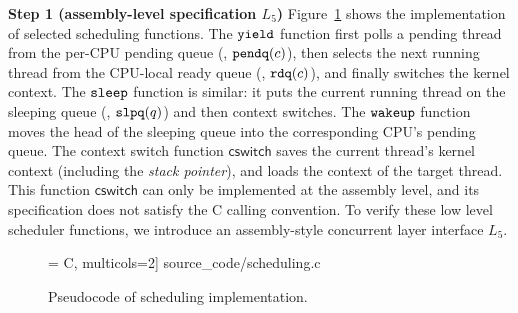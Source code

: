 {\noindent\textbf{Step 1 (assembly-level specification $L_5$)} 
Figure~\ref{fig:exp:sched} shows the implementation
of selected scheduling functions.
The ${\texttt{yield}}$ function first polls a pending
thread from the per-CPU pending queue
(\ie, ${\texttt{pendq}}(c)$),
then selects the next running thread
from the CPU-local ready queue
(\ie, ${\texttt{rdq}}(c)$),
and finally switches the kernel context.
The ${\texttt{sleep}}$ function is similar: it
puts the current running thread
on the sleeping queue (\ie, ${\texttt{slpq}}(q)$) and
then context switches.
The ${\texttt{wakeup}}$ function moves the head of the sleeping queue
into the corresponding CPU's pending queue.
The context switch function $\mathsf{cswitch}$
saves the current thread's kernel context (including the 
\emph{stack pointer}),
and loads the context of the target thread.
This function $\mathsf{cswitch}$ can only be implemented at the assembly level,
and its specification does not satisfy the C calling convention.
To verify these low level scheduler functions, we introduce an
assembly-style concurrent layer interface $L_5$.
\begin{figure}[t]
 = C, multicols=2] {source_code/scheduling.c}
\caption{Pseudocode of scheduling implementation.}
\label{fig:exp:sched}
\hrulefill
\end{figure}


}
